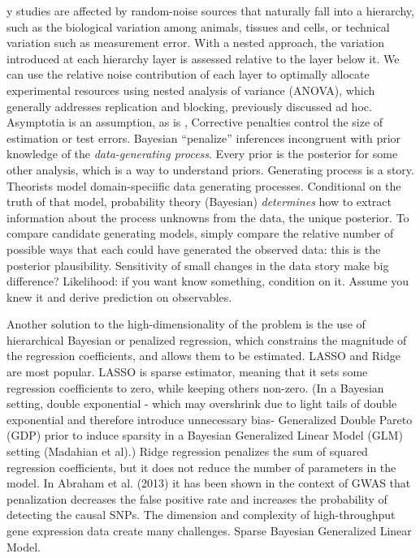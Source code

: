 \documentclass{article}
\begin{document}
y studies are affected by random-noise sources that naturally fall into a hierarchy, such as the biological variation among animals, tissues and cells, or technical variation such as measurement error. With a nested approach, the variation introduced at each hierarchy layer is assessed relative to the layer below it. We can use the relative noise contribution of each layer to optimally allocate experimental resources using nested analysis of variance (ANOVA), which generally addresses replication and blocking, previously discussed ad hoc.
Asymptotia is an assumption, as is 
,
Corrective penalties control the size of estimation or test errors. Bayesian ``penalize'' inferences incongruent with prior knowledge of the \textit{data-generating process}. Every prior is the posterior for some other analysis, which is a way to understand priors. Generating process is a story. Theorists model domain-speciific data generating processes. Conditional on the truth of that model, probability theory (Bayesian) \textit{determines} how to extract information about the process unknowns from the data, the unique posterior. To compare candidate generating models, simply compare the relative number of possible ways that each could have generated the observed data: this is the posterior plausibility. Sensitivity of small changes in the data story make big difference? Likelihood: if you want know something, condition on it. Assume you knew it and derive prediction on observables. 

Another solution to the high-dimensionality of the problem is the use of hierarchical Bayesian or penalized regression, which constrains the magnitude of the regression coefficients, and allows them to be estimated. LASSO and Ridge are most popular. LASSO is sparse estimator, meaning that it sets some regression coefficients to zero, while keeping others non-zero. (In a Bayesian setting, double exponential - which may overshrink due to light tails of double exponential and therefore introduce unnecessary bias- Generalized Double Pareto (GDP) prior to induce sparsity in a Bayesian Generalized Linear Model (GLM) setting (Madahian et al).) Ridge regression penalizes the sum of squared regression coefficients, but it does not reduce the number of parameters in the model. 
In Abraham et al. (2013) it has been shown in the context of GWAS that penalization decreases the false positive rate and increases the probability of detecting the causal SNPs.
The dimension and complexity of high-throughput gene expression data create many challenges.
Sparse Bayesian Generalized Linear Model.
\end{document}
